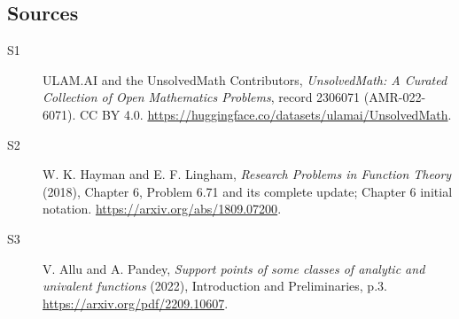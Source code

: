 \documentclass[11pt]{article}
\begin{document}
\subsection{Sources}
\begin{description}
\item[\hypertarget{source:2306071:1}{S1}] ULAM.AI and the UnsolvedMath Contributors, \emph{UnsolvedMath: A Curated Collection of Open Mathematics Problems}, record 2306071 (AMR-022-6071). CC BY 4.0. \url{https://huggingface.co/datasets/ulamai/UnsolvedMath}.
\item[\hypertarget{source:2306071:2}{S2}] W. K. Hayman and E. F. Lingham, \emph{Research Problems in Function Theory} (2018), Chapter 6, Problem 6.71 and its complete update; Chapter 6 initial notation. \url{https://arxiv.org/abs/1809.07200}.
\item[\hypertarget{source:2306071:3}{S3}] V. Allu and A. Pandey, \emph{Support points of some classes of analytic and univalent functions} (2022), Introduction and Preliminaries, p.3. \url{https://arxiv.org/pdf/2209.10607}.
\end{description}
\label{end:2306071}
\end{document}
